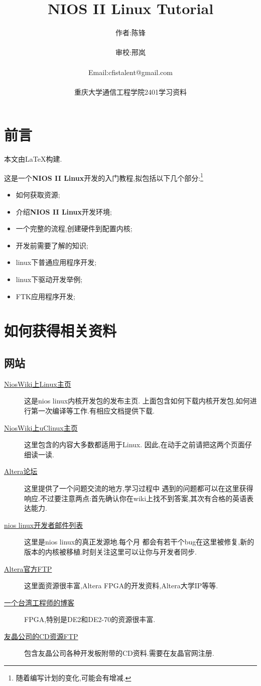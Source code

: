 \documentclass[12pt,a4paper,titlepage]{article}
\title{NIOS II Linux Tutorial}
\author{作者:陈锋\\\\审校:邢岚\\\\Email:cfistalent@gmail.com\\\\重庆大学通信工程学院2401学习资料}
\begin{document}
\thispagestyle{empty}
\maketitle{}
\section{前言}
本文由\LaTeX{}构建.

这是一个\textbf{NIOS II Linux}开发的入门教程,拟包括以下几个部分:\footnote{随着编写计划的变化,可能会有增减.}
\begin{itemize}
\item 如何获取资源;
\item 介绍\textbf{NIOS II Linux}开发环境;
\item 一个完整的流程,创建硬件到配置内核;
\item 开发前需要了解的知识;
\item linux下普通应用程序开发;
\item linux下驱动开发举例;
\item FTK应用程序开发;
\end{itemize}
\newpage{}
\section{如何获得相关资料}
\subsection{网站}
\begin{description}
\item[\href{http://www.nioswiki.com/Linux}{NiosWiki上Linux主页}] 这是nios linux内核开发包的发布主页.
上面包含如何下载内核开发包,如何进行第一次编译等工作.有相应文档提供下载.
\item[\href{http://www.nioswiki.com/OperatingSystems/UClinux}{NiosWiki上uClinux主页}] 这里包含的内容大多数都适用于Linux.
因此,在动手之前请把这两个页面仔细读一读.
\item[\href{http://www.alteraforum.com/forum/forumdisplay.php?f=37}{Altera论坛}] 这里提供了一个问题交流的地方,学习过程中
遇到的问题都可以在这里获得响应.不过要注意两点:{首先确认你在wiki上找不到答案,其次有合格的英语表达能力}.
\item[\href{http://sopc.et.ntust.edu.tw/pipermail/nios2-dev/}{nios linux开发者邮件列表}] 这里是nios linux的真正发源地.每个月
都会有若干个bug在这里被修复,新的版本的内核被移植.时刻关注这里可以让你与开发者同步.
\item[\href{ftp://ftp.altera.com/up/pub/}{Altera官方FTP}] 这里面资源很丰富,Altera FPGA的开发资料,Altera大学IP等等.
\item[\href{http://www.cnblogs.com/oomusou/}{一个台湾工程师的博客}] FPGA,特别是DE2和DE2-70的资源很丰富.
\item[\href{http://www.terasic.com/downloads/cd-rom/}{友晶公司的CD资源FTP}] 包含友晶公司各种开发板附带的CD资料.需要在友晶官网注册.
\end{description}
\end{document}
